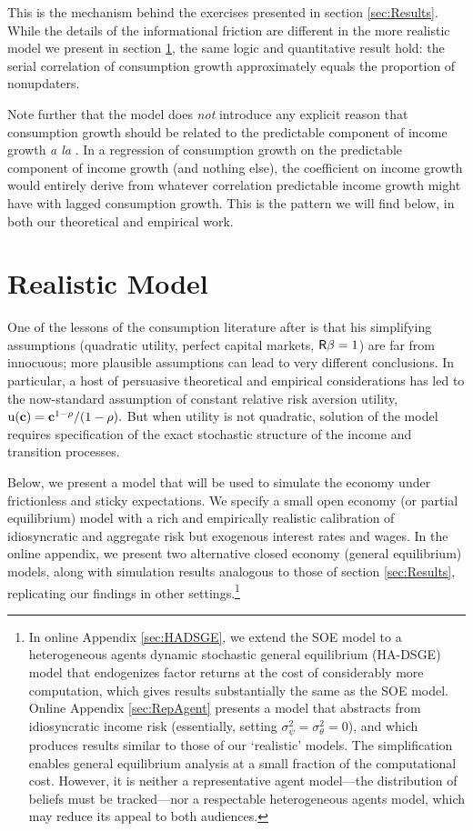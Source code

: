 \documentclass[titlepage]{./econtex}
\begin{document}
This is the mechanism behind the exercises presented in section \ref{sec:Results}.  While the details of the informational friction are different in the more realistic model we present in section \ref{sec:models}, the same logic and quantitative result hold: the serial correlation of consumption growth approximately equals the proportion of nonupdaters.

Note further that the model does {\it not} introduce any explicit reason that consumption growth should be related to the predictable component of income growth {\it a la} \cite{cmModel}.  In a regression of consumption growth on the predictable component of income growth (and nothing else), the coefficient on income growth would entirely derive from whatever correlation predictable income growth might have with lagged consumption growth.  This is the pattern we will find below, in both our theoretical and empirical work.



\section{Realistic Model}
\label{sec:models}

One of the lessons of the consumption literature after \cite{hallRandomWalk} is that his simplifying assumptions (quadratic utility, perfect capital markets, $\mathsf{R}\beta=1$) are far from innocuous; more plausible assumptions can lead to very different conclusions.  In particular, a host of persuasive theoretical and empirical considerations has led to the now-standard assumption of constant relative risk aversion utility, ${\mathrm{u}}(\mathbf{c})=\mathbf{c}^{1-\rho}/(1-\rho).$ But when utility is not quadratic, solution of the model requires specification of the exact stochastic structure of the income and transition processes.

Below, we present a model that will be used to simulate the economy under frictionless and sticky expectations.  We specify a small open economy (or partial equilibrium) model with a rich and empirically realistic calibration of idiosyncratic and aggregate risk but exogenous interest rates and wages. In the online appendix, we present two alternative closed economy (general equilibrium) models, along with simulation results analogous to those of section \ref{sec:Results}, replicating our findings in other settings.\footnote{In online Appendix \ref{sec:HADSGE}, we extend the SOE model to a heterogeneous agents dynamic stochastic general equilibrium (HA-DSGE) model that endogenizes factor returns at the cost of considerably more computation, which gives results substantially the same as the SOE model.  Online Appendix \ref{sec:RepAgent} presents a model that abstracts from idiosyncratic income risk (essentially, setting $\sigma^{2}_{\psi}=\sigma^{2}_{\theta}=0$), and which produces results similar to those of our `realistic' models.  The simplification enables general equilibrium analysis at a small fraction of the computational cost. However, it is neither a representative agent model---the distribution of beliefs must be tracked---nor a respectable heterogeneous agents model, which may reduce its appeal to both audiences.}
\end{document}
